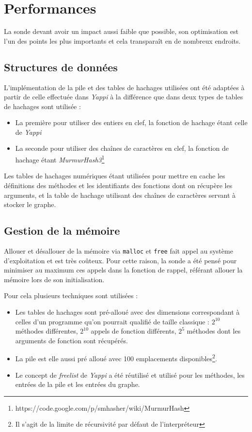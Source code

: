   \section{Performances}
  \label{sec:performances}
      
La sonde devant avoir un impact aussi faible que possible, son optimisation est l'un des points les plus importants et cela transparaît en de nombreux endroits.

\subsection{Structures de données}
L'implémentation de la pile et des tables de hachages utilisées ont été adaptées à partir de celle effectuée dans \emph{Yappi} à la différence que dans \Blackfire deux types de tables de hachages sont utilisée :
\begin{itemize}
\item La première pour utiliser des entiers en clef, la fonction de hachage étant celle de \emph{Yappi}
\item La seconde pour utiliser des chaînes de caractères en clef, la fonction de hachage étant \emph{MurmurHash3}\footnote{https://code.google.com/p/smhasher/wiki/MurmurHash}
\end{itemize}

Les tables de hachages numériques étant utilisées pour mettre en cache les définitions des méthodes et les identifiants des fonctions dont on récupère les arguments, et la table de hachage utilisant des chaînes de caractères servant à stocker le graphe.

\subsection{Gestion de la mémoire}
Allouer et désallouer de la mémoire via \verb|malloc| et \verb|free| fait appel au système d'exploitation et est très coûteux. Pour cette raison, la sonde \Python a été pensé pour minimiser au maximum ces appels dans la fonction de rappel, référant allouer la mémoire lors de son initialisation.

Pour cela plusieurs techniques sont utilisées : 
\begin{itemize}
\item Les tables de hachages sont pré-alloué avec des dimensions correspondant à celles d'un programme qu'on pourrait qualifié de taille classique : $2^{10}$ méthodes différentes, $2^{10}$ appels de fonction différents, $2^5$ méthodes dont les arguments de fonction sont récupérés.
\item La pile est elle aussi pré alloué avec 100 emplacements disponibles\footnote{Il s'agit de la limite de récursivité par défaut de l'interpréteur \Python}.
\item Le concept de \emph{freelist} de \emph{Yappi} a été réutilisé et utilisé pour les méthodes, les entrées de la pile et les entrées du graphe.
\end{itemize}

